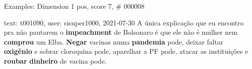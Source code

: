 \begin{frame}{Examples: Dimension 1 pos, score 7, \# 000008}
\footnotesize
\begin{exampleblock}{text: t001090, user: sisuper1000, 2021-07-30}
A única explicação que eu encontro pra não pautarem o \textbf{impeachment} de 
Bolsonaro é que ele não é mulher nem \textbf{comprou} um Elba. \textbf{Negar} 
vacinas numa \textbf{pandemia} pode, deixar faltar \textbf{oxigênio} e sobrar 
cloroquina pode, aparelhar a PF pode, atacar as instituições e \textbf{roubar} 
\textbf{dinheiro} de vacina pode. 
\end{exampleblock}
\end{frame}
